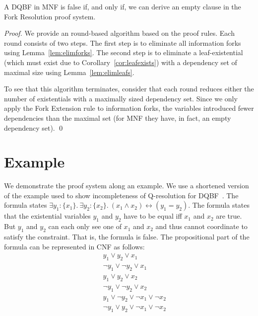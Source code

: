 \documentclass{svjour3}
\newcommand{\set}[1]{{\{#1\}}}
\begin{document}
\begin{theorem}
\label{thm:soundandcomplete}
	A DQBF in MNF is false if, and only if, we can derive an empty clause in the Fork Resolution proof system.
\end{theorem}

\begin{proof}
We provide an round-based algorithm based on the proof rules. 
Each round consists of two steps. 
The first step is to eliminate all information forks using Lemma~\ref{lem:elimforks}. 
The second step is to eliminate a leaf-existential (which must exist due to Corollary~\ref{cor:leafexists}) with a dependency set of maximal size using Lemma~\ref{lem:elimleafs}.

To see that this algorithm terminates, consider that each round reduces either the number of existentials with a maximally sized dependency set.
Since we only apply the Fork Extension rule to information forks, the variables introduced fewer dependencies than the maximal set (for MNF they have, in fact, an empty dependency set).
\qed
\end{proof}




\section{Example}
\label{sect:example}
We demonstrate the proof system along an example. 
We use a shortened version of the example used to show incompleteness of Q-resolution for DQBF~\cite{BalabanovChiangJiang/2014/ACertificationPerspectiveOfDQBF}. 
The formula states $\exists y_1: \set{x_1}.~\exists y_2: \set{x_2}.~(x_1\wedge x_2) \leftrightarrow (y_1=y_2)$.
The formula states that the existential variables $y_1$ and $y_2$ have to be equal iff $x_1$ and $x_2$ are true.
But $y_1$ and $y_2$ can each only see one of $x_1$ and $x_2$ and thus cannot coordinate to satisfy the constraint. 
That is, the formula is false.
The propositional part of the formula can be represented in CNF as follows:
\begin{eqnarray}
&& y_1 \vee y_2\vee x_1 \\ %
&& \neg y_1\vee \neg y_2\vee x_1 \\ %
&& y_1\vee y_2\vee x_2 \\ %
&& \neg y_1\vee \neg y_2\vee x_2 \\ %
&& y_1\vee \neg y_2\vee \neg x_1\vee \neg x_2 \\ %
&& \neg y_1\vee y_2\vee \neg x_1\vee \neg x_2 %
\end{eqnarray}
\end{document}
